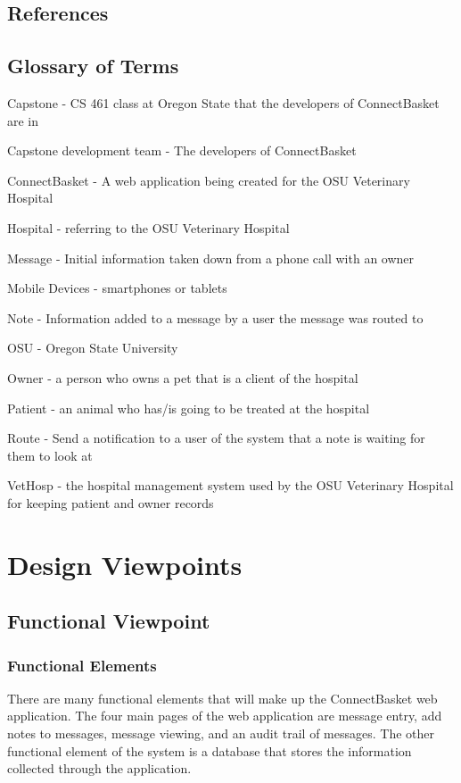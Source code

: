 \documentclass[onecolumn, draftclsnofoot,10pt, compsoc]{IEEEtran}
\begin{document}
\subsection{References}

\subsection{Glossary of Terms}
Capstone - CS 461 class at Oregon State that the developers of ConnectBasket are in 

Capstone development team - The developers of ConnectBasket

ConnectBasket - A web application being created for the OSU Veterinary Hospital

Hospital - referring to the OSU Veterinary Hospital

Message - Initial information taken down from a phone call with an owner

Mobile Devices - smartphones or tablets

Note - Information added to a message by a user the message was routed to

OSU - Oregon State University

Owner - a person who owns a pet that is a client of the hospital

Patient - an animal who has/is going to be treated at the hospital 

Route - Send a notification to a user of the system that a note is waiting for them to look at

VetHosp - the hospital management system used by the OSU Veterinary Hospital for keeping patient and owner records

\section{Design Viewpoints}

\subsection{Functional Viewpoint}

\subsubsection{Functional Elements}
There are many functional elements that will make up the ConnectBasket web application. The four main pages of the web application are message entry, add notes to messages, message viewing, and an audit trail of messages. The other functional element of the system is a database that stores the information collected through the application.
\end{document}
